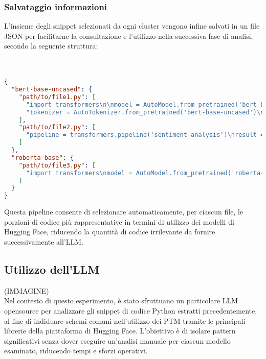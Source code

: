 \documentclass{article}
\begin{document}
\subsubsection{Salvataggio informazioni}
L'insieme degli snippet selezionati da ogni cluster vengono infine salvati in un file JSON per facilitarne la consultazione e l’utilizzo nella successiva fase di analisi, secondo la seguente struttura:\\\\\\
\begin{lstlisting}[language=json, caption={Esempio di struttura JSON dei migliori snippet selezionati}, label={lst:json-example}]
{
  "bert-base-uncased": {
    "path/to/file1.py": [
      "import transformers\n\nmodel = AutoModel.from_pretrained('bert-base-uncased')",
      "tokenizer = AutoTokenizer.from_pretrained('bert-base-uncased')\ninputs = tokenizer('Hello world', return_tensors='pt')"
    ],
    "path/to/file2.py": [
      "pipeline = transformers.pipeline('sentiment-analysis')\nresult = pipeline('I love coding!')"
    ]
  },
  "roberta-base": {
    "path/to/file3.py": [
      "import transformers\nmodel = AutoModel.from_pretrained('roberta-base')"
    ]
  }
}
\end{lstlisting}
Questa pipeline consente di selezionare automaticamente, per ciascun file, le porzioni di codice più rappresentative in termini di utilizzo dei modelli di Hugging Face, riducendo la quantità di codice irrilevante da fornire successivamente all'LLM.


\subsection{Utilizzo dell'LLM}
(IMMAGINE)\\
Nel contesto di questo esperimento, è stato sfruttuano un particolare LLM opensource per analizzare gli snippet di codice Python estratti precedentemente, al fine di indiduare schemi comuni nell'utilizzo dei PTM tramite le principali librerie della piattaforma di Hugging Face.
L'obiettivo è di isolare pattern significativi senza dover eseguire un'analisi manuale per ciascun modello esaminato, riducendo tempi e sforzi operativi.
\end{document}
